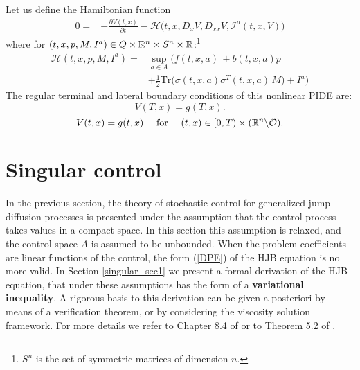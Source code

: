 Let us define the Hamiltonian function
\begin{align} \nonumber
 0 = & - \frac{\partial V(t,x)}{\partial t} - \mathcal{H}\bigl( t,x,D_x V, D_{xx} V, \mathcal{I}^a(t,x,V) \bigr) 
\end{align}
where for $(t,x,p,M,I^a) \in Q \times \mathbb{R}^n \times S^n \times \mathbb{R}$:\footnote{$S^n$ is the set of symmetric matrices of dimension $n$.} 
\begin{align}\label{Hamiltonian}
 \mathcal{H}(t,x,p,M,I^a) =& \sup_{a \in A} \biggl( f(t,x,a) \, + b(t,x,a) p \\ \nonumber
              &+ \frac{1}{2} \mbox{Tr} \bigl( \sigma(t,x,a)\sigma^T(t,x,a) \, M \bigr) +I^a \biggr) 
\end{align}
The regular terminal and lateral boundary conditions of this nonlinear PIDE are: 
\begin{equation}\label{DPE_term_cond}
 V(T,x) = g(T,x).
\end{equation}
\begin{equation}\label{DPE_lateral_cond}
 V(t,x) = g(t,x) \quad \mbox{ for } \quad (t,x) \in [0,T)\times (\mathbb{R}^n \backslash \mathcal{O}). 
\end{equation}


\section{Singular control}\label{singular_control}

In the previous section, the theory of stochastic control for generalized jump-diffusion processes is presented under the assumption that the control process 
takes values in a compact space.
In this section this assumption is relaxed, and the control space $A$ is assumed to be unbounded.
When the problem coefficients are linear functions of the control, the form (\ref{DPE}) of the HJB equation is no more valid. 
In Section \ref{singular_sec1}
we present a formal derivation of the HJB equation, that under these assumptions has the form of a \textbf{variational inequality}. 
A rigorous basis to this derivation can be given a posteriori by means of a verification theorem, or by considering the viscosity solution framework. 
For more details we refer to Chapter 8.4 of \cite{FlemingSoner} or to Theorem 5.2 of \cite{OksendalSulem}.

